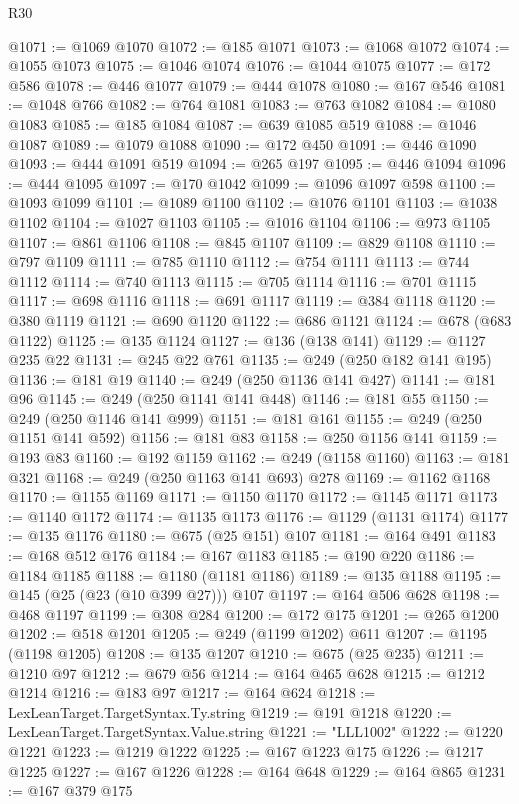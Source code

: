 \begin{lexlean}{R30}
\begin{coremodule}
@1071 := @1069 @1070
@1072 := @185 @1071
@1073 := @1068 @1072
@1074 := @1055 @1073
@1075 := @1046 @1074
@1076 := @1044 @1075
@1077 := @172 @586
@1078 := @446 @1077
@1079 := @444 @1078
@1080 := @167 @546
@1081 := @1048 @766
@1082 := @764 @1081
@1083 := @763 @1082
@1084 := @1080 @1083
@1085 := @185 @1084
@1087 := @639 @1085 @519
@1088 := @1046 @1087
@1089 := @1079 @1088
@1090 := @172 @450
@1091 := @446 @1090
@1093 := @444 @1091 @519
@1094 := @265 @197
@1095 := @446 @1094
@1096 := @444 @1095
@1097 := @170 @1042
@1099 := @1096 @1097 @598
@1100 := @1093 @1099
@1101 := @1089 @1100
@1102 := @1076 @1101
@1103 := @1038 @1102
@1104 := @1027 @1103
@1105 := @1016 @1104
@1106 := @973 @1105
@1107 := @861 @1106
@1108 := @845 @1107
@1109 := @829 @1108
@1110 := @797 @1109
@1111 := @785 @1110
@1112 := @754 @1111
@1113 := @744 @1112
@1114 := @740 @1113
@1115 := @705 @1114
@1116 := @701 @1115
@1117 := @698 @1116
@1118 := @691 @1117
@1119 := @384 @1118
@1120 := @380 @1119
@1121 := @690 @1120
@1122 := @686 @1121
@1124 := @678 (@683 @1122)
@1125 := @135 @1124
@1127 := @136 (@138 @141)
@1129 := @1127 @235 @22
@1131 := @245 @22 @761
@1135 := @249 (@250 @182 @141 @195)
@1136 := @181 @19
@1140 := @249 (@250 @1136 @141 @427)
@1141 := @181 @96
@1145 := @249 (@250 @1141 @141 @448)
@1146 := @181 @55
@1150 := @249 (@250 @1146 @141 @999)
@1151 := @181 @161
@1155 := @249 (@250 @1151 @141 @592)
@1156 := @181 @83
@1158 := @250 @1156 @141
@1159 := @193 @83
@1160 := @192 @1159
@1162 := @249 (@1158 @1160)
@1163 := @181 @321
@1168 := @249 (@250 @1163 @141 @693) @278
@1169 := @1162 @1168
@1170 := @1155 @1169
@1171 := @1150 @1170
@1172 := @1145 @1171
@1173 := @1140 @1172
@1174 := @1135 @1173
@1176 := @1129 (@1131 @1174)
@1177 := @135 @1176
@1180 := @675 (@25 @151) @107
@1181 := @164 @491
@1183 := @168 @512 @176
@1184 := @167 @1183
@1185 := @190 @220
@1186 := @1184 @1185
@1188 := @1180 (@1181 @1186)
@1189 := @135 @1188
@1195 := @145 (@25 (@23 (@10 @399 @27))) @107
@1197 := @164 @506 @628
@1198 := @468 @1197
@1199 := @308 @284
@1200 := @172 @175
@1201 := @265 @1200
@1202 := @518 @1201
@1205 := @249 (@1199 @1202) @611
@1207 := @1195 (@1198 @1205)
@1208 := @135 @1207
@1210 := @675 (@25 @235)
@1211 := @1210 @97
@1212 := @679 @56
@1214 := @164 @465 @628
@1215 := @1212 @1214
@1216 := @183 @97
@1217 := @164 @624
@1218 := LexLeanTarget.TargetSyntax.Ty.string
@1219 := @191 @1218
@1220 := LexLeanTarget.TargetSyntax.Value.string
@1221 := "LLL1002"
@1222 := @1220 @1221
@1223 := @1219 @1222
@1225 := @167 @1223 @175
@1226 := @1217 @1225
@1227 := @167 @1226
@1228 := @164 @648
@1229 := @164 @865
@1231 := @167 @379 @175

\end{coremodule}
\end{lexlean}
